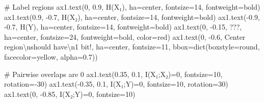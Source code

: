 \documentclass[
  11pt,
  letterpaper,
  oneside,
  openany]{book}
\newenvironment{Shaded}{\begin{snugshade}}{\end{snugshade}}
\newcommand{\BuiltInTok}[1]{\textcolor[rgb]{0.00,0.23,0.31}{#1}}
\newcommand{\CharTok}[1]{\textcolor[rgb]{0.13,0.47,0.30}{#1}}
\newcommand{\CommentTok}[1]{\textcolor[rgb]{0.37,0.37,0.37}{#1}}
\newcommand{\DecValTok}[1]{\textcolor[rgb]{0.68,0.00,0.00}{#1}}
\newcommand{\FloatTok}[1]{\textcolor[rgb]{0.68,0.00,0.00}{#1}}
\newcommand{\NormalTok}[1]{\textcolor[rgb]{0.00,0.23,0.31}{#1}}
\newcommand{\OperatorTok}[1]{\textcolor[rgb]{0.37,0.37,0.37}{#1}}
\newcommand{\StringTok}[1]{\textcolor[rgb]{0.13,0.47,0.30}{#1}}
\begin{document}
\begin{Shaded}
\begin{Highlighting}[]
\CommentTok{\# Label regions}
\NormalTok{ax1.text(}\DecValTok{0}\NormalTok{, }\FloatTok{0.9}\NormalTok{, }\StringTok{\textquotesingle{}H(X₁)\textquotesingle{}}\NormalTok{, ha}\OperatorTok{=}\StringTok{\textquotesingle{}center\textquotesingle{}}\NormalTok{, fontsize}\OperatorTok{=}\DecValTok{14}\NormalTok{, fontweight}\OperatorTok{=}\StringTok{\textquotesingle{}bold\textquotesingle{}}\NormalTok{)}
\NormalTok{ax1.text(}\FloatTok{0.9}\NormalTok{, }\OperatorTok{{-}}\FloatTok{0.7}\NormalTok{, }\StringTok{\textquotesingle{}H(X₂)\textquotesingle{}}\NormalTok{, ha}\OperatorTok{=}\StringTok{\textquotesingle{}center\textquotesingle{}}\NormalTok{, fontsize}\OperatorTok{=}\DecValTok{14}\NormalTok{, fontweight}\OperatorTok{=}\StringTok{\textquotesingle{}bold\textquotesingle{}}\NormalTok{)}
\NormalTok{ax1.text(}\OperatorTok{{-}}\FloatTok{0.9}\NormalTok{, }\OperatorTok{{-}}\FloatTok{0.7}\NormalTok{, }\StringTok{\textquotesingle{}H(Y)\textquotesingle{}}\NormalTok{, ha}\OperatorTok{=}\StringTok{\textquotesingle{}center\textquotesingle{}}\NormalTok{, fontsize}\OperatorTok{=}\DecValTok{14}\NormalTok{, fontweight}\OperatorTok{=}\StringTok{\textquotesingle{}bold\textquotesingle{}}\NormalTok{)}
\NormalTok{ax1.text(}\DecValTok{0}\NormalTok{, }\OperatorTok{{-}}\FloatTok{0.15}\NormalTok{, }\StringTok{\textquotesingle{}???\textquotesingle{}}\NormalTok{, ha}\OperatorTok{=}\StringTok{\textquotesingle{}center\textquotesingle{}}\NormalTok{, fontsize}\OperatorTok{=}\DecValTok{24}\NormalTok{, fontweight}\OperatorTok{=}\StringTok{\textquotesingle{}bold\textquotesingle{}}\NormalTok{, color}\OperatorTok{=}\StringTok{\textquotesingle{}red\textquotesingle{}}\NormalTok{)}
\NormalTok{ax1.text(}\DecValTok{0}\NormalTok{, }\OperatorTok{{-}}\FloatTok{0.6}\NormalTok{, }\StringTok{\textquotesingle{}Center region}\CharTok{\textbackslash{}n}\StringTok{should have}\CharTok{\textbackslash{}n}\StringTok{1 bit!\textquotesingle{}}\NormalTok{, ha}\OperatorTok{=}\StringTok{\textquotesingle{}center\textquotesingle{}}\NormalTok{, fontsize}\OperatorTok{=}\DecValTok{11}\NormalTok{,}
\NormalTok{         bbox}\OperatorTok{=}\BuiltInTok{dict}\NormalTok{(boxstyle}\OperatorTok{=}\StringTok{\textquotesingle{}round\textquotesingle{}}\NormalTok{, facecolor}\OperatorTok{=}\StringTok{\textquotesingle{}yellow\textquotesingle{}}\NormalTok{, alpha}\OperatorTok{=}\FloatTok{0.7}\NormalTok{))}

\CommentTok{\# Pairwise overlaps are 0}
\NormalTok{ax1.text(}\FloatTok{0.35}\NormalTok{, }\FloatTok{0.1}\NormalTok{, }\StringTok{\textquotesingle{}I(X₁;X₂)=0\textquotesingle{}}\NormalTok{, fontsize}\OperatorTok{=}\DecValTok{10}\NormalTok{, rotation}\OperatorTok{={-}}\DecValTok{30}\NormalTok{)}
\NormalTok{ax1.text(}\OperatorTok{{-}}\FloatTok{0.35}\NormalTok{, }\FloatTok{0.1}\NormalTok{, }\StringTok{\textquotesingle{}I(X₁;Y)=0\textquotesingle{}}\NormalTok{, fontsize}\OperatorTok{=}\DecValTok{10}\NormalTok{, rotation}\OperatorTok{=}\DecValTok{30}\NormalTok{)}
\NormalTok{ax1.text(}\DecValTok{0}\NormalTok{, }\OperatorTok{{-}}\FloatTok{0.85}\NormalTok{, }\StringTok{\textquotesingle{}I(X₂;Y)=0\textquotesingle{}}\NormalTok{, fontsize}\OperatorTok{=}\DecValTok{10}\NormalTok{)}


\end{Highlighting}
\end{Shaded}
\end{document}
